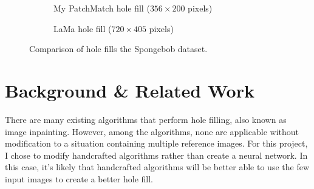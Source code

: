 \begin{figure}
\centering
\hfill
\begin{subfigure}{0.45\linewidth}
\caption{My PatchMatch hole fill ($356\times200$ pixels)}
\label{fig:pmsponge}
\end{subfigure}
\hfill
\begin{subfigure}{0.45\linewidth}
\caption{LaMa hole fill ($720\times405$ pixels)}
\label{fig:lamasponge}
\end{subfigure}
\caption{Comparison of hole fills the Spongebob dataset.}
\label{fig:spongefillcompare}
\end{figure}

\section{Background \& Related Work}
\label{sec:survey}

There are many existing algorithms that perform hole filling, also known as image inpainting. However, among the algorithms, none are applicable without modification to a situation containing multiple reference images. For this project, I chose to modify handcrafted algorithms rather than create a neural network. In this case, it's likely that handcrafted algorithms will be better able to use the few input images to create a better hole fill.

